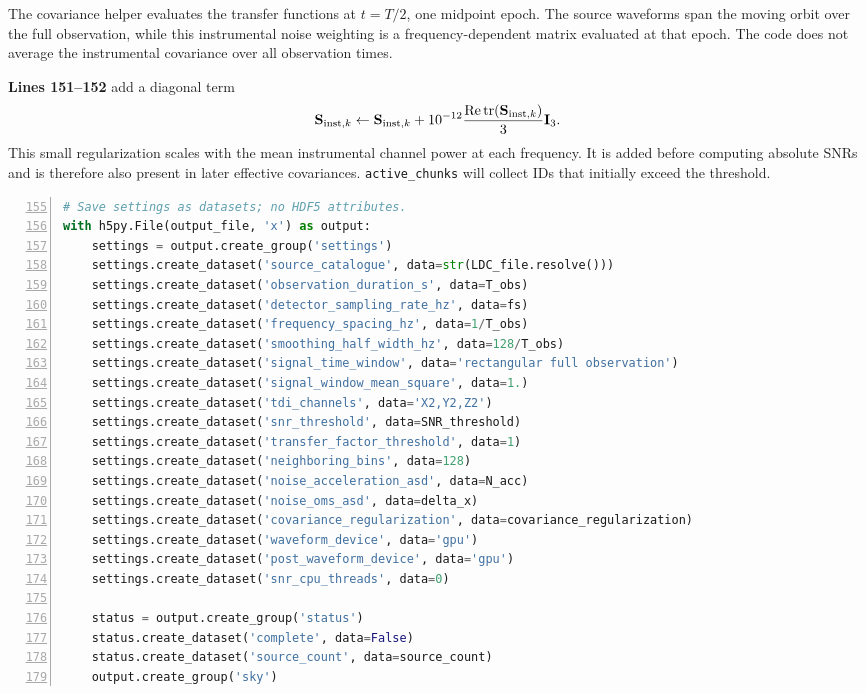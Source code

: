 \documentclass[11pt,a4paper]{article}
\newcommand{\code}[1]{\texttt{\nolinkurl{#1}}}
\newcommand{\linesref}[2]{\textbf{Lines #1--#2}}
\begin{document}
The covariance helper evaluates the transfer functions at
\(t=T/2\), one midpoint epoch. The source waveforms span the moving
orbit over the full observation, while this instrumental noise weighting
is a frequency-dependent matrix evaluated at that epoch. The code does
not average the instrumental covariance over all observation times.

\linesref{151}{152} add a diagonal term
\[
\mathbf S_{{\rm inst},k}\leftarrow
\mathbf S_{{\rm inst},k}
+10^{-12}\frac{\operatorname{Re}\operatorname{tr}
(\mathbf S_{{\rm inst},k})}{3}\mathbf I_3.
\]
This small regularization scales with the mean instrumental channel
power at each frequency. It is added before computing absolute SNRs and
is therefore also present in later effective covariances.
\code{active_chunks} will collect IDs that initially exceed the threshold.

\begin{lstlisting}[language=Python,numbers=left,showlines=true,firstnumber=155]
# Save settings as datasets; no HDF5 attributes.
with h5py.File(output_file, 'x') as output:
    settings = output.create_group('settings')
    settings.create_dataset('source_catalogue', data=str(LDC_file.resolve()))
    settings.create_dataset('observation_duration_s', data=T_obs)
    settings.create_dataset('detector_sampling_rate_hz', data=fs)
    settings.create_dataset('frequency_spacing_hz', data=1/T_obs)
    settings.create_dataset('smoothing_half_width_hz', data=128/T_obs)
    settings.create_dataset('signal_time_window', data='rectangular full observation')
    settings.create_dataset('signal_window_mean_square', data=1.)
    settings.create_dataset('tdi_channels', data='X2,Y2,Z2')
    settings.create_dataset('snr_threshold', data=SNR_threshold)
    settings.create_dataset('transfer_factor_threshold', data=1)
    settings.create_dataset('neighboring_bins', data=128)
    settings.create_dataset('noise_acceleration_asd', data=N_acc)
    settings.create_dataset('noise_oms_asd', data=delta_x)
    settings.create_dataset('covariance_regularization', data=covariance_regularization)
    settings.create_dataset('waveform_device', data='gpu')
    settings.create_dataset('post_waveform_device', data='gpu')
    settings.create_dataset('snr_cpu_threads', data=0)

    status = output.create_group('status')
    status.create_dataset('complete', data=False)
    status.create_dataset('source_count', data=source_count)
    output.create_group('sky')

\end{lstlisting}
\end{document}
